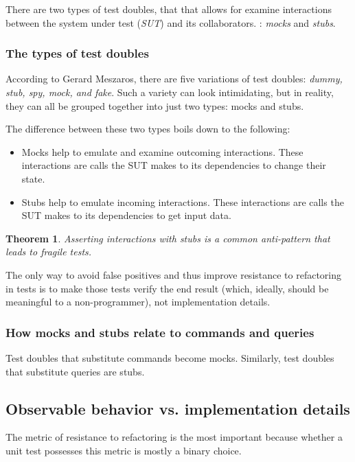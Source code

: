 \documentclass{article}
\newtheorem{theorem}{Theorem}
\begin{document}
There are two types of test doubles, that that allows for examine interactions between the system under test (\textit{SUT}) and its collaborators. : \textit{mocks} and \textit{stubs}.

\subsubsection{The types of test doubles}

According to Gerard Meszaros, there are five variations of test doubles: \textit{dummy, stub, spy, mock, and fake}. Such a variety can look intimidating, but in reality, they can all be grouped together into just two types: mocks and stubs.

The difference between these two types boils down to the following: 
\begin{itemize}
	\item Mocks help to emulate and examine outcoming interactions. These interactions are calls the SUT makes to its dependencies to change their state.
	\item Stubs help to emulate incoming interactions. These interactions are calls the SUT makes to its dependencies to get input data.
\end{itemize}

\begin{theorem}
Asserting interactions with stubs is a common anti-pattern that leads to fragile tests.
\end{theorem}

The only way to avoid false positives and thus improve resistance to refactoring in tests is to make those tests verify the end result (which, ideally, should be meaningful to a non-programmer), not implementation details.

\subsubsection{How mocks and stubs relate to commands and queries}

Test doubles that substitute commands become mocks. Similarly, test doubles that substitute queries are stubs. 

\subsection{Observable behavior vs. implementation details}
The metric of resistance to refactoring is the most important because whether a unit test possesses this metric is mostly a binary choice. 
\end{document}
